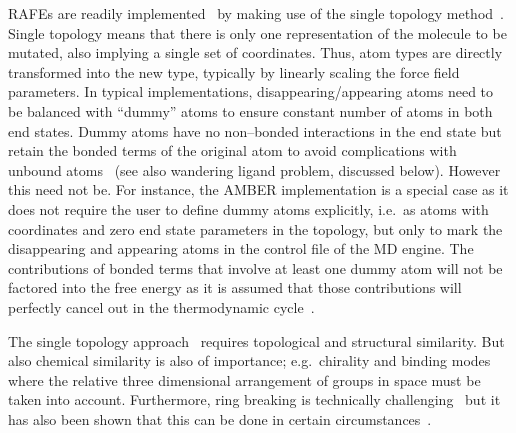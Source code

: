 \documentclass[journal=jctcce,manuscript=article]{achemso}
\begin{document}
RAFEs are readily implemented~\cite{doi:10.1021/j100056a020, Michel2010} by 
making use of the single topology method~\cite{doi:10.1063/1.449208,
doi:10.1021/j100056a020, doi:10.1021/jp981628n}.  Single topology means that 
there is only one representation of the molecule to be mutated, also implying a 
single set of coordinates.  Thus, atom types are directly transformed into the 
new type, typically by linearly scaling the force field parameters.  In typical 
implementations, disappearing/appearing atoms need to be balanced with 
``dummy'' atoms to ensure constant number of atoms in both end states.  Dummy 
atoms have no non--bonded interactions in the end state but retain the bonded 
terms of the original atom to avoid complications with unbound 
atoms~\cite{doi:10.1021/jp981628n} (see also wandering ligand problem, 
discussed below).  However this need not be. For instance, the AMBER 
implementation is a special case as it does not require the user to define 
dummy atoms explicitly, i.e.\ as atoms with coordinates and zero end state 
parameters in the topology, but only to mark the disappearing and appearing 
atoms in the control file of the MD engine.  The contributions of bonded terms 
that involve at least one dummy atom will not be factored into the free energy 
as it is assumed that those contributions will perfectly cancel out in the 
thermodynamic cycle~\cite{doi:10.1021/acs.jcim.5b00057, doi:10.1021/jp994193s}.

The single topology approach~\cite{doi:10.1021/j100056a020} requires
topological and structural similarity.  But also chemical similarity is also of 
importance; e.g.\ chirality and binding modes where the relative three 
dimensional arrangement of groups in space must be taken into account.  
Furthermore, ring breaking is technically 
challenging~\cite{doi:10.1021/acs.jctc.6b00991} but it has also been
shown that this can be done in certain 
circumstances~\cite{doi:10.1021/acs.jcim.5b00057,
  doi:10.1021/jp994193s}.
\end{document}
